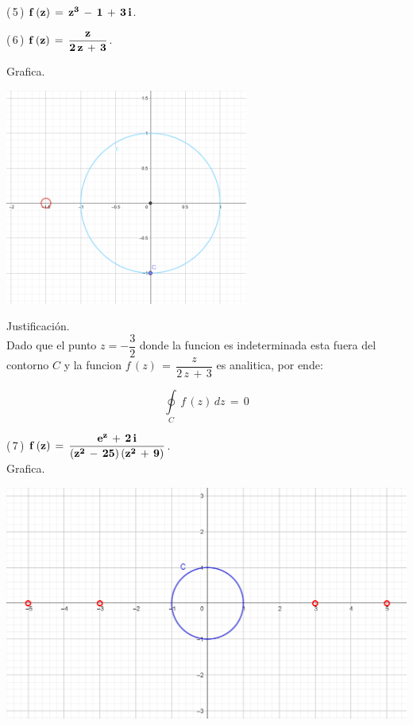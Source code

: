 \documentclass[a4paper,11pt,openany]{book}
\begin{document}
\textcolor{ao(english)}{(\,5\,)} $\bf{f\,(z)\,=\,z^{3}\,-\,1\,+\,3\,i}$.

\textcolor{ao(english)}{(\,6\,)} $\bf{f\,(z)\,=\,\dfrac{z}{2\,z\,+\,3}}$.

\textcolor{ao(english)}{} Grafica.

\begin{center}
     \includegraphics[width=8cm]{Gra-Ej-6.png}
\end{center}

\textcolor{ao(english)}{} Justificación.\\

Dado que el punto $z=-\dfrac{3}{2}$ donde la funcion es indeterminada esta fuera del contorno $C$
y la funcion  $f\,(z)\,=\,\dfrac{z}{2\,z\,+\,3}$ es analitica, por ende:

$$\oint\limits_{C}\,f\,(z)\,dz\,=\,0$$

\textcolor{ao(english)}{(\,7\,)} $\bf{f\,(z)\,=\,\dfrac{e^{z}\,+\,2\,i}{(z^{2}\,-\,25)\,(z^{2}\,+\,9)}}$.\\

\textcolor{ao(english)}{} Grafica.

\begin{center}
     \includegraphics[width=15cm]{Gra-Ej-7.png}
\end{center}
\end{document}
